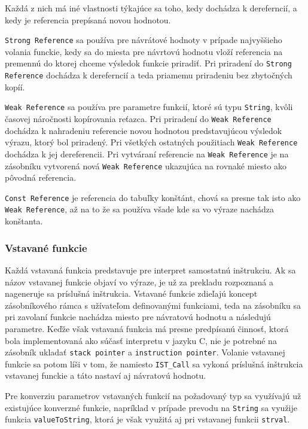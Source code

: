 \documentclass[12pt,a4paper,titlepage,final]{article}
\begin{document}
Každá z nich má iné vlastnosti týkajúce sa toho, kedy dochádza k dereferncií, a kedy
je referencia prepísaná novou hodnotou.

\texttt{Strong Reference} sa používa pre návrátové hodnoty v prípade najvyššieho volania funckie,
kedy sa do miesta pre návrtovú hodnotu vloží referencia na premennú do ktorej chceme
výsledok funkcie priradiť. Pri priradení do \texttt{Strong Reference} dochádza k dereferncií a teda
priamemu priradeniu bez zbytočných kopíí.

\texttt{Weak Reference} sa používa pre parametre funkcií, ktoré sú typu \texttt{String}, kvôli časovej náročnosti
kopírovania reťazca. Pri priradení do \texttt{Weak Reference} dochádza k nahradeniu referencie
novou hodnotou predstavujúcou výsledok výrazu, ktorý bol priradený. Pri všetkých ostatných použitiach
\texttt{Weak Reference} dochádza k jej dereferencii. Pri vytváraní referencie na \texttt{Weak Reference}
je na zásobníku vytvorená nová \texttt{Weak Reference} ukazujúca na rovnaké miesto ako pôvodná referencia.

\texttt{Const Reference} je referencia do tabuľky konštánt, chová sa presne tak isto ako \texttt{Weak Reference},
až na to že sa používa všade kde sa vo výraze nachádza konštanta.

\subsubsection{Vstavané funkcie}
Každá vstavaná funkcia predstavuje pre interpret samostatnú inštrukciu. Ak sa
názov vstavanej funkcie objaví vo výraze, je už za prekladu rozpoznaná a 
nageneruje sa príslušná inštrukcia. Vstavané funkcie zdieľajú koncept zásobníkového
rámca s užívateľom definovanými funkciami, teda na zásobníku sa pri zavolaní funkcie 
nachádza miesto pre návratovú hodnotu a následujú parametre. Keďže však vstavaná funkcia
má presne predpísanú činnosť, ktorá bola implementovaná ako súčasť interpretu v jazyku C,
nie je potrebné na zásobník ukladať \texttt{stack pointer} a \texttt{instruction pointer}.
Volanie vstavanej funkcie sa potom líši v tom, že namiesto \texttt{IST\_Call} sa vykoná 
príslušná inštrukcia vstavanej funckie a táto nastaví aj návratovú hodnotu.

Pre konverziu parametrov vstavaných funkcií na požadovaný typ sa využívajú už existujúce
konverzné funkcie, napríklad v prípade prevodu na \texttt{String} sa využije funkcia
\texttt{valueToString}, ktorá je však využitá aj pri vstavanej funkcii \texttt{strval}.
\end{document}
